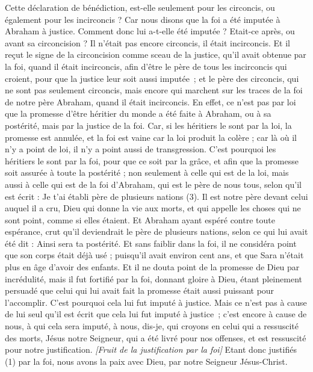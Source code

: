 \begin{multicols}{2}
Cette déclaration de bénédiction, est-elle seulement pour les circoncis, ou également pour les incirconcis ? Car nous disons que la foi a été imputée à Abraham à justice.
Comment donc lui a-t-elle été imputée ? Etait-ce après, ou avant sa circoncision ? Il n’était pas encore circoncis, il était incirconcis.
Et il reçut le signe de la circoncision comme sceau de la justice, qu’il avait obtenue par la foi, quand il était incirconcis, afin d’être le père de tous les incirconcis qui croient, pour que la justice leur soit aussi imputée ;
et le père des circoncis, qui ne sont pas seulement circoncis, mais encore qui marchent sur les traces de la foi de notre père Abraham, quand il était incirconcis.
En effet, ce n’est pas par loi que la promesse d'être héritier du monde a été faite à Abraham, ou à sa postérité, mais par la justice de la foi.
Car, si les héritiers le sont par la loi, la promesse est annulée, et la foi est vaine
car la loi produit la colère ; car là où il n'y a point de loi, il n'y a point aussi de transgression.
C'est pourquoi les héritiers le sont par la foi, pour que ce soit par la grâce, et afin que la promesse soit assurée à toute la postérité ; non seulement à celle qui est de la loi, mais aussi à celle qui est de la foi d'Abraham, qui est le père de nous tous,
selon qu'il est écrit : Je t'ai établi père de plusieurs nations (3). Il est notre père devant celui auquel il a cru, Dieu qui donne la vie aux morts, et qui appelle les choses qui ne sont point, comme si elles étaient.
Et Abraham ayant espéré contre toute espérance, crut qu'il deviendrait le père de plusieurs nations, selon ce qui lui avait été dit : Ainsi sera ta postérité.
Et sans faiblir dans la foi, il ne considéra point que son corps était déjà usé ; puisqu’il avait environ cent ans, et que Sara n’était plus en âge d'avoir des enfants.
Et il ne douta point de la promesse de Dieu par incrédulité, mais il fut fortifié par la foi, donnant gloire à Dieu,
étant pleinement persuadé que celui qui lui avait fait la promesse était aussi puissant pour l'accomplir.
C'est pourquoi cela lui fut imputé à justice.
Mais ce n’est pas à cause de lui seul qu’il est écrit que cela lui fut imputé à justice ;
c’est encore à cause de nous, à qui cela sera imputé, à nous, dis-je, qui croyons en celui qui a ressuscité des morts, Jésus notre Seigneur,
qui a été livré pour nos offenses, et est ressuscité pour notre justification.
\textit{[Fruit de la justification par la foi]}
\VerseOne{}Etant donc justifiés (1) par la foi, nous avons la paix avec Dieu, par notre Seigneur Jésus-Christ.

\end{multicols}
